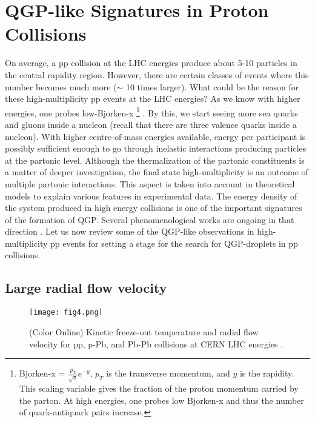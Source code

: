 \documentclass[showpacs,showkeys,aps,twocolumn]{revtex4}
\newcommand\+{\dagger}
\begin{document}
\section{QGP-like Signatures in Proton Collisions}
\label{section5}
On average, a pp collision at the LHC energies produce about 5-10 particles in the central rapidity region. However, there are certain classes of events where this number becomes much more ($\sim$ 10 times larger). What could be the reason for these high-multiplicity pp events at the LHC energies? As we know with higher energies, one probes low-Bjorken-x \footnote{Bjorken-x = $\frac{p_T}{\sqrt s}e^{-y}$, $p_T$ is the transverse momentum, and $y$ is the rapidity. This scaling variable gives the fraction of the proton momentum carried by the parton. At high energies, one probes low Bjorken-x and thus the number of quark-antiquark pairs increase.} . By this, we start seeing more sea quarks and gluons inside a nucleon (recall that there are three valence quarks inside a nucleon). With higher centre-of-mass energies available, energy per participant is possibly sufficient enough to go through inelastic interactions producing particles at the partonic level. Although the thermalization of the partonic constituents is a matter of deeper investigation, the final state high-multiplicity is an outcome of multiple partonic interactions. This aspect is taken into account in theoretical models to explain various features in experimental data. The energy density of the system produced in high energy collisions is one of the important signatures of the formation of QGP. Several phenomenological works are ongoing in that direction \cite{Ref8,Ref9}. Let us now review some of the QGP-like observations in high-multiplicity pp events for setting a stage for the search for QGP-droplets in pp collisions.
 
\subsection{Large radial flow velocity}
\begin{figure}[ht]
\texttt{[image: fig4.png]}
\caption[]{(Color Online) Kinetic freeze-out temperature and radial flow velocity for pp, p-Pb, and Pb-Pb collisions at CERN LHC energies \cite{Ref17}.}
\label{fig4}
\end{figure}
\end{document}
